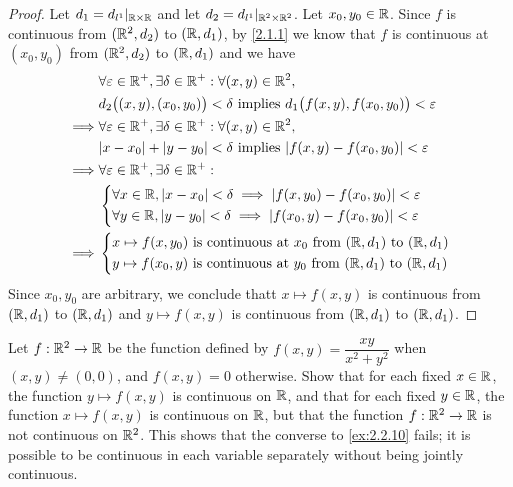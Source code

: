 \begin{proof}
  Let \(d_1 = d_{l^1}|_{\mathbb{R} \times \mathbb{R}}\) and let \(d_2 = d_{l^1}|_{\mathbb{R}^2 \times \mathbb{R}^2}\).
  Let \(x_0, y_0 \in \mathbb{R}\).
  Since \(f\) is continuous from \((\mathbb{R}^2, d_2)\) to \((\mathbb{R}, d_1)\), by \cref{2.1.1} we know that \(f\) is continuous at \((x_0, y_0)\) from \((\mathbb{R}^2, d_2)\) to \((\mathbb{R}, d_1)\) and we have
  \begin{align*}
             & \forall \varepsilon \in \R^+, \exists \delta \in \R^+ : \forall (x, y) \in \R^2,                          \\
             & d_2\big((x, y), (x_0, y_0)\big) < \delta \text{ implies } d_1\big(f(x, y), f(x_0, y_0)\big) < \varepsilon \\
    \implies & \forall \varepsilon \in \R^+, \exists \delta \in \R^+ : \forall (x, y) \in \R^2,                          \\
             & \abs{x - x_0} + \abs{y - y_0} < \delta \text{ implies } \abs{f(x, y) - f(x_0, y_0)} < \varepsilon         \\
    \implies & \forall \varepsilon \in \R^+, \exists \delta \in \R^+ :                                                   \\
             & \begin{dcases}
                 \forall x \in \R, \abs{x - x_0} < \delta \implies \abs{f(x, y_0) - f(x_0, y_0)} < \varepsilon \\
                 \forall y \in \R, \abs{y - y_0} < \delta \implies \abs{f(x_0, y) - f(x_0, y_0)} < \varepsilon
               \end{dcases}             \\
    \implies & \begin{dcases}
                 x \mapsto f(x, y_0) \text{ is continuous at } x_0 \text{ from } (\R, d_1) \text{ to } (\R, d_1) \\
                 y \mapsto f(x_0, y) \text{ is continuous at } y_0 \text{ from } (\R, d_1) \text{ to } (\R, d_1)
               \end{dcases}
  \end{align*}
  Since \(x_0, y_0\) are arbitrary, we conclude thatt \(x \mapsto f(x, y)\) is continuous from \((\mathbb{R}, d_1)\) to \((\mathbb{R}, d_1)\) and \(y \mapsto f(x, y)\) is continuous from \((\mathbb{R}, d_1)\) to \((\mathbb{R}, d_1)\).
\end{proof}

\begin{ex}\label{ex:2.2.11}
  Let \(f : \mathbb{R}^2 \to \mathbb{R}\) be the function defined by \(f(x, y) = \dfrac{xy}{x^2 + y^2}\) when \((x, y) \neq (0, 0)\), and \(f(x, y) = 0\) otherwise.
  Show that for each fixed \(x \in \mathbb{R}\), the function \(y \mapsto f(x, y)\) is continuous on \(\mathbb{R}\), and that for each fixed \(y \in \mathbb{R}\), the function \(x \mapsto f(x, y)\) is continuous on \(\mathbb{R}\), but that the function \(f : \mathbb{R}^2 \to \mathbb{R}\) is not continuous on \(\mathbb{R}^2\).
  This shows that the converse to \cref{ex:2.2.10} fails;
  it is possible to be continuous in each variable separately without being jointly continuous.
\end{ex}

